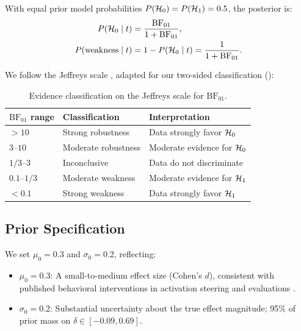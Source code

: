 With equal prior model probabilities $P(\mathcal{H}_0) = P(\mathcal{H}_1) = 0.5$, the posterior is:
\begin{align}
P(\mathcal{H}_0 \mid t) &= \frac{\mathrm{BF}_{01}}{1 + \mathrm{BF}_{01}}, \\
P(\text{weakness} \mid t) &= 1 - P(\mathcal{H}_0 \mid t) = \frac{1}{1 + \mathrm{BF}_{01}}.
\label{eq:posterior}
\end{align}

We follow the Jeffreys scale \citep{jeffreys1961theory}, adapted for our two-sided
classification ():

\begin{table}[h]
\centering
\caption{Evidence classification on the Jeffreys scale for $\mathrm{BF}_{01}$.}
\label{tab:jeffreys}
\small
\begin{tabular}{@{}lll@{}}
\toprule
$\mathrm{BF}_{01}$ range & Classification & Interpretation \\
\midrule
$> 10$       & Strong robustness   & Data strongly favor $\mathcal{H}_0$ \\
$3$--$10$    & Moderate robustness & Moderate evidence for $\mathcal{H}_0$ \\
$1/3$--$3$   & Inconclusive        & Data do not discriminate \\
$0.1$--$1/3$ & Moderate weakness   & Moderate evidence for $\mathcal{H}_1$ \\
$< 0.1$      & Strong weakness     & Data strongly favor $\mathcal{H}_1$ \\
\bottomrule
\end{tabular}
\end{table}

\subsection{Prior Specification}

We set $\mu_0 = 0.3$ and $\sigma_0 = 0.2$, reflecting:
\begin{itemize}[leftmargin=*,itemsep=0pt,topsep=2pt]
\item $\mu_0 = 0.3$: A small-to-medium effect size (Cohen's $d$), consistent with
published behavioral interventions in activation steering \citep{turner2023actadd,kelkar2026persona}
and \rlhf evaluations \citep{abahana2026rlhf}.
\item $\sigma_0 = 0.2$: Substantial uncertainty about the true effect magnitude;
95\% of prior mass on $\delta \in [-0.09, 0.69]$.
\end{itemize}

